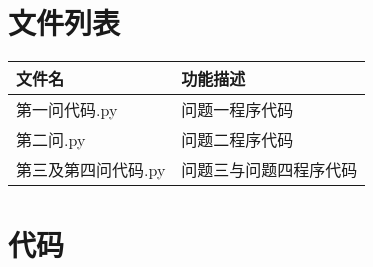 \documentclass[withoutpreface,bwprint]{cumcmthesis}
\begin{document}
\newpage
\begin{appendices}
\section{文件列表}
\begin{table}[H]
\centering
\begin{tabularx}{\textwidth}{LL}
\toprule
文件名   & 功能描述 \\
\midrule
 第一问代码.py&问题一程序代码\\
第二问.py & 问题二程序代码 \\
第三及第四问代码.py&问题三与问题四程序代码\\

\bottomrule
\end{tabularx}
\label{tab:文件列表}
\end{table}

\section{代码}
\noindent 
% 
% 
%  


\end{appendices}
\end{document}
